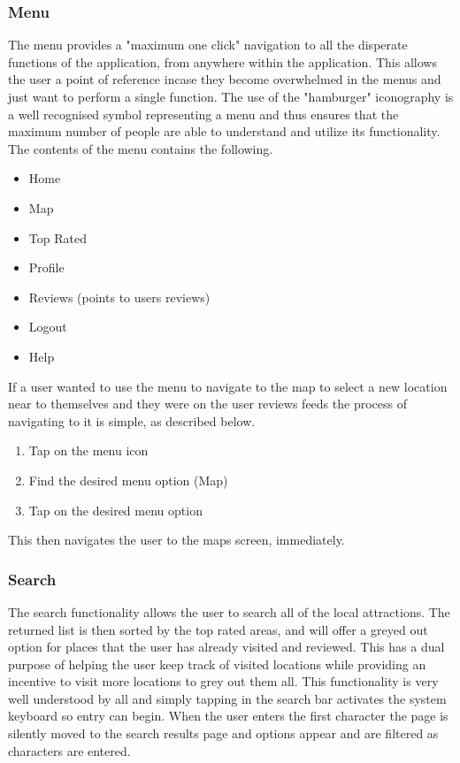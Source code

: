 \documentclass{article}
\begin{document}
\subsubsection{Menu}
The menu provides a "maximum one click" navigation to all the disperate functions of the application, from anywhere within the application.
This allows the user a point of reference incase they become overwhelmed in the menus and just want to perform a single function.
The use of the "hamburger" iconography is a well recognised symbol representing a menu and thus ensures that the maximum number of people are able to understand and utilize its functionality.
The contents of the menu contains the following.
\begin{itemize}
	\item Home
	\item Map
	\item Top Rated
	\item Profile
	\item Reviews (points to users reviews)
	\item Logout
	\item Help
\end{itemize}
If a user wanted to use the menu to navigate to the map to select a new location near to themselves and they were on the user reviews feeds the process of navigating to it is simple, as described below.
\begin{enumerate}
	\item Tap on the menu icon
	\item Find the desired menu option (Map)
	\item Tap on the desired menu option
\end{enumerate}
This then navigates the user to the maps screen, immediately.
\subsubsection{Search}
The search functionality allows the user to search all of the local attractions.
The returned list is then sorted by the top rated areas, and will offer a greyed out option for places that the user has already visited and reviewed.
This has a dual purpose of helping the user keep track of visited locations while providing an incentive to visit more locations to grey out them all.
This functionality is very well understood by all and simply tapping in the search bar activates the system keyboard so entry can begin.
When the user enters the first character the page is silently moved to the search results page and options appear and are filtered as characters are entered.
\end{document}
